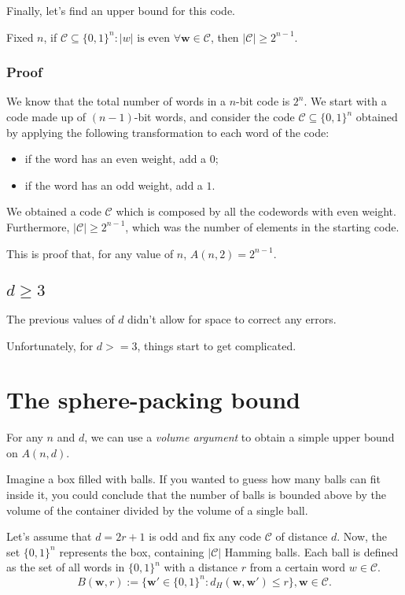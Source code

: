 Finally, let's find an upper bound for this code.
\begin{lemma}
    Fixed $n$, if $ \mathcal{C} \subseteq \{0,1\}^n : |w| \text{ is even } \forall \mathbf{w}\in \mathcal{C}$, then $|\mathcal{C}| \geq 2^{n-1}$.%
\end{lemma}
\subsubsection*{Proof}
We know that the total number of words in a $n$-bit code is $2^n$. We start with a code made up of $(n-1)$-bit words, and consider the code $\mathcal{C} \subseteq \{0,1\}^n$ obtained by applying the following transformation to each word of the code:
\begin{itemize}
    \item if the word has an even weight, add a $0$;
    \item if the word has an odd weight, add a $1$.
\end{itemize}

We obtained a code $\mathcal{C}$ which is composed by all the codewords with even weight. Furthermore, $|\mathcal{C}| \geq 2^{n-1}$, which was the number of elements in the starting code. %

This is proof that, for any value of $n$, $A(n,2) = 2^{n-1}$.

\subsection*{$d\geq 3$}
The previous values of $d$ didn't allow for space to correct any errors.

Unfortunately, for $d >= 3$, things start to get complicated.

\section{The sphere-packing bound}

For any $n$ and $d$, we can use a \emph{volume argument} to obtain a simple upper bound on $A(n, d)$.

Imagine a box filled with balls. If you wanted to guess how many balls can fit inside it, you could conclude that the number of balls is bounded above by the volume of the container divided by the volume of a single ball.

Let's assume that $d = 2r+1$ is odd and fix any code $\mathcal{C}$ of distance $d$. Now, the set $\{0,1\}^n$ represents the box, containing $|\mathcal{C}|$ Hamming balls. Each ball is defined as the set of all words in $\{0,1\}^n$ with a distance $r$ from a certain word $w \in \mathcal{C}$.
\begin{equation}
    B(\mathbf{w}, r) := \{\mathbf{w}' \in \{0,1\}^n : d_H(\mathbf{w}, \mathbf{w}') \leq r\}, \mathbf{w} \in \mathcal{C}.
\end{equation}

